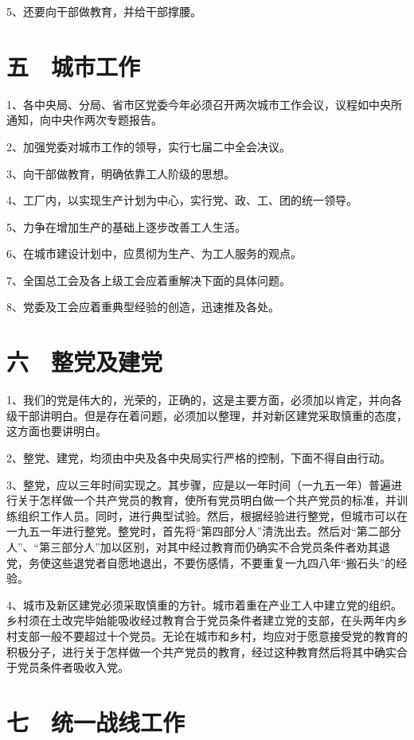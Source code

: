 5、还要向干部做教育，并给干部撑腰。

\section{五　城市工作}

1、各中央局、分局、省市区党委今年必须召开两次城市工作会议，议程如中央所通知，向中央作两次专题报告。

2、加强党委对城市工作的领导，实行七届二中全会决议。

3、向干部做教育，明确依靠工人阶级的思想。

4、工厂内，以实现生产计划为中心，实行党、政、工、团的统一领导。

5、力争在增加生产的基础上逐步改善工人生活。

6、在城市建设计划中，应贯彻为生产、为工人服务的观点。

7、全国总工会及各上级工会应着重解决下面的具体问题。

8、党委及工会应着重典型经验的创造，迅速推及各处。

\section{六　整党及建党}

1、我们的党是伟大的，光荣的，正确的，这是主要方面，必须加以肯定，并向各级干部讲明白。但是存在着问题，必须加以整理，并对新区建党采取慎重的态度，这方面也要讲明白。

2、整党、建党，均须由中央及各中央局实行严格的控制，下面不得自由行动。

3、整党，应以三年时间实现之。其步骤，应是以一年时间（一九五一年）普遍进行关于怎样做一个共产党员的教育，使所有党员明白做一个共产党员的标准，并训练组织工作人员。同时，进行典型试验。然后，根据经验进行整党，但城市可以在一九五一年进行整党。整党时，首先将“第四部分人”清洗出去。然后对“第二部分人”、“第三部分人”加以区别，对其中经过教育而仍确实不合党员条件者劝其退党，务使这些退党者自愿地退出，不要伤感情，不要重复一九四八年“搬石头”的经验。

4、城市及新区建党必须采取慎重的方针。城市着重在产业工人中建立党的组织。乡村须在土改完毕始能吸收经过教育合于党员条件者建立党的支部，在头两年内乡村支部一般不要超过十个党员。无论在城市和乡村，均应对于愿意接受党的教育的积极分子，进行关于怎样做一个共产党员的教育，经过这种教育然后将其中确实合于党员条件者吸收入党。

\section{七　统一战线工作}

